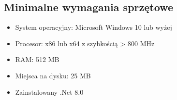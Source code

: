 \begin{flushleft}
    \subsection{\Large{Minimalne wymagania sprzętowe}}
    \begin{itemize}
        \item System operacyjny: Microsoft Windows 10 lub wyżej
        \item Procesor: x86 lub x64 z szybkością > 800 MHz
        \item RAM: 512 MB
        \item Miejsca na dysku: 25 MB
        \item Zainstalowany .Net 8.0
    \end{itemize}
\end{flushleft}

